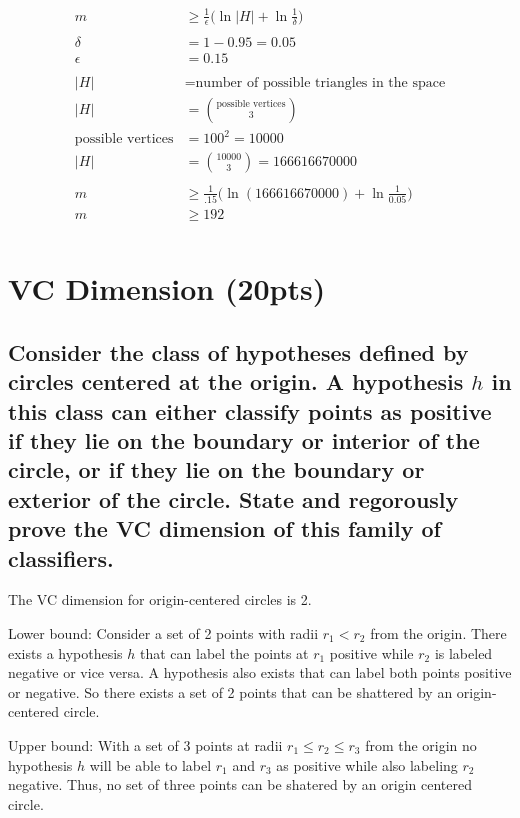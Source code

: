 \documentclass[11pt]{article}
\begin{document}
\begin{align*}
	m &\geq \frac{1}{\epsilon}\bigg(\ln \vert H \vert + \ln\frac{1}{\delta}\bigg)\\
	\\
	\delta &= 1-0.95 = 0.05\\
	\epsilon &= 0.15\\
	\\
	\vert H \vert &= \text{number of possible triangles in the space}\\
	\vert H \vert &= {{\text{possible vertices}}\choose{3}}\\
	\text{possible vertices} &= 100^2 = 10000\\
	\vert H \vert &= {{10000}\choose{3}}=166616670000\\
	\\
	m &\geq \frac{1}{.15}\bigg(\ln(166616670000) + \ln\frac{1}{0.05}\bigg)\\
	m &\geq 192\\
\end{align*}

\section{VC Dimension (20pts)}

\subsection{Consider the class of hypotheses defined by circles centered at the origin. A hypothesis $h$ in this class can either classify points as positive if they lie on the boundary or interior of the circle, or if they lie on the boundary or exterior of the circle. State and regorously prove the VC dimension of this family of classifiers.}

The VC dimension for origin-centered circles is 2.

Lower bound: Consider a set of 2 points with radii $r_1 < r_2$ from the origin. There exists a hypothesis $h$ that can label the points at $r_1$ positive while $r_2$ is labeled negative or vice versa. A hypothesis also exists that can label both points positive or negative. So there exists a set of 2 points that can be shattered by an origin-centered circle.

Upper bound: With a set of 3 points at radii $r_1 \leq r_2 \leq r_3$ from the origin no hypothesis $h$ will be able to label $r_1$ and $r_3$ as positive while also labeling $r_2$ negative. Thus, no set of three points can be shatered by an origin centered circle.
\end{document}
